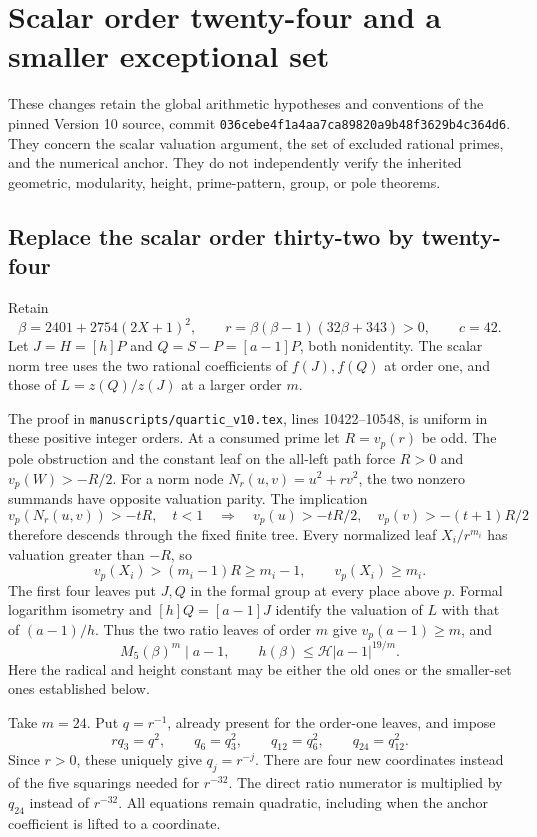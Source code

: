 \section{Scalar order twenty-four and a smaller exceptional set}

These changes retain the global arithmetic hypotheses and conventions of
the pinned Version 10 source, commit
\texttt{036cebe4f1a4aa7ca89820a9b48f3629b4c364d6}. They concern the
scalar valuation argument, the set of excluded rational primes, and the
numerical anchor. They do not independently verify the inherited geometric,
modularity, height, prime-pattern, group, or pole theorems.

\subsection{Replace the scalar order thirty-two by twenty-four}

Retain
\[
 \beta=2401+2754(2X+1)^2,\qquad
 r=\beta(\beta-1)(32\beta+343)>0,\qquad c=42.
\]
Let $J=H=[h]P$ and $Q=S-P=[a-1]P$, both nonidentity. The scalar
norm tree uses the two rational coefficients of $f(J),f(Q)$ at order
one, and those of $L=z(Q)/z(J)$ at a larger order $m$.

The proof in \texttt{manuscripts/quartic\_v10.tex}, lines
10422--10548, is uniform in these positive integer orders. At a consumed
prime let $R=v_p(r)$ be odd. The pole obstruction and the constant leaf
on the all-left path force $R>0$ and $v_p(W)>-R/2$.
For a norm node $N_r(u,v)=u^2+rv^2$, the two nonzero summands have
opposite valuation parity. The implication
\[
 v_p(N_r(u,v))>-tR,\quad t<1
 \quad\Longrightarrow\quad
 v_p(u)>-tR/2,\quad v_p(v)>-(t+1)R/2
\]
therefore descends through the fixed finite tree. Every normalized
leaf $X_i/r^{m_i}$ has valuation greater than $-R$, so
\[
 v_p(X_i)>(m_i-1)R\ge m_i-1,
 \qquad v_p(X_i)\ge m_i.
\]
The first four leaves put $J,Q$ in the formal group at every place above
$p$. Formal logarithm isometry and $[h]Q=[a-1]J$ identify the valuation
of $L$ with that of $(a-1)/h$. Thus the two ratio leaves of order $m$
give $v_p(a-1)\ge m$, and
\[
 M_5(\beta)^m\mid a-1,\qquad
 h(\beta)\le\mathcal H |a-1|^{19/m}.
\]
Here the radical and height constant may be either the old ones or the
smaller-set ones established below.

Take $m=24$. Put $q=r^{-1}$, already present for the order-one leaves,
and impose
\[
 rq_3=q^2,\qquad q_6=q_3^2,\qquad
 q_{12}=q_6^2,\qquad q_{24}=q_{12}^2.
\]
Since $r>0$, these uniquely give $q_j=r^{-j}$. There are four new
coordinates instead of the five squarings needed for $r^{-32}$.
The direct ratio numerator is multiplied by $q_{24}$ instead of
$r^{-32}$. All equations remain quadratic, including when the anchor
coefficient is lifted to a coordinate.


